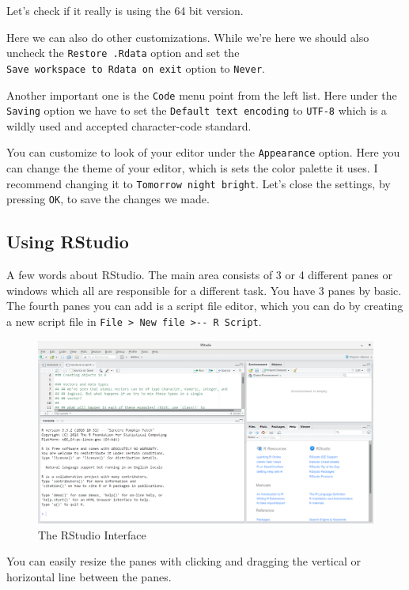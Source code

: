\documentclass[
]{book}
\begin{document}
Let's check if it really is using the 64 bit version.

Here we can also do other customizations. While we're here we should
also uncheck the \texttt{Restore\ .Rdata} option and set the
\texttt{Save\ workspace\ to\ Rdata\ on\ exit} option to \texttt{Never}.

Another important one is the \texttt{Code} menu point from the left list. Here
under the \texttt{Saving} option we have to set the \texttt{Default\ text\ encoding} to
\texttt{UTF-8} which is a wildly used and accepted character-code standard.

You can customize to look of your editor under the \texttt{Appearance} option.
Here you can change the theme of your editor, which is sets the color
palette it uses. I recommend changing it to \texttt{Tomorrow\ night\ bright}.
Let's close the settings, by pressing \texttt{OK}, to save the changes we made.

\hypertarget{using-rstudio}{%
\subsection{Using RStudio}\label{using-rstudio}}

A few words about RStudio. The main area consists of 3 or 4 different
panes or windows which all are responsible for a different task. You
have 3 panes by basic. The fourth panes you can add is a script file
editor, which you can do by creating a new script file in
\texttt{File\ \textgreater{}\ New\ file\ \textgreater{}-\/-\ R\ Script}.

\begin{figure}
\includegraphics[width=1\linewidth]{img/rstudio-screenshot} \caption{The RStudio Interface}\label{fig:RStudio-GUI}
\end{figure}

You can easily resize the panes with clicking and dragging the vertical
or horizontal line between the panes.
\end{document}
